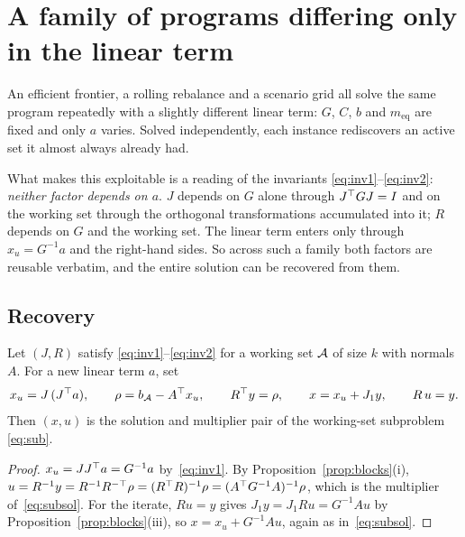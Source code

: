 \section{A family of programs differing only in the linear term}
\label{sec:sweep}

An efficient frontier, a rolling rebalance and a scenario grid all solve the same
program repeatedly with a slightly different linear term: $G$, $C$, $b$ and
$m_{\mathrm{eq}}$ are fixed and only $a$ varies. Solved independently, each
instance rediscovers an active set it almost always already had.

What makes this exploitable is a reading of the invariants
\eqref{eq:inv1}--\eqref{eq:inv2}: \emph{neither factor depends on $a$}. $J$
depends on $G$ alone through $J^{\top} G J = I$ and on the working set through the
orthogonal transformations accumulated into it; $R$ depends on $G$ and the working
set. The linear term enters only through $x_u = G^{-1}a$ and the right-hand sides.
So across such a family both factors are reusable verbatim, and the entire
solution can be recovered from them.

\subsection{Recovery}

\begin{proposition}\label{prop:recover}
Let $(J,R)$ satisfy \eqref{eq:inv1}--\eqref{eq:inv2} for a working set $\mathcal{A}$
of size $k$ with normals $A$. For a new linear term $a$, set
\begin{equation}
  x_u = J\,(J^{\top} a),
  \qquad
  \rho = b_{\mathcal{A}} - A^{\top} x_u,
  \qquad
  R^{\top} y = \rho,
  \qquad
  x = x_u + J_1 y,
  \qquad
  R\,u = y .
  \label{eq:recover}
\end{equation}
Then $(x,u)$ is the solution and multiplier pair of the working-set subproblem
\eqref{eq:sub}.
\end{proposition}

\begin{proof}
$x_u = JJ^{\top} a = G^{-1}a$ by~\eqref{eq:inv1}. By Proposition~\ref{prop:blocks}(i),
$u = R^{-1}y = R^{-1}R^{-\top}\rho = (R^{\top} R)^{-1}\rho = (A^{\top} G^{-1}A)^{-1}\rho$,
which is the multiplier of~\eqref{eq:subsol}. For the iterate, $Ru = y$ gives
$J_1 y = J_1 R u = G^{-1}A u$ by Proposition~\ref{prop:blocks}(iii), so
$x = x_u + G^{-1}Au$, again as in~\eqref{eq:subsol}.
\end{proof}

